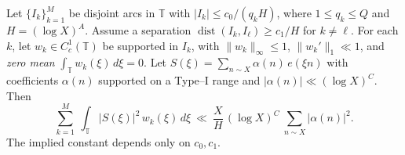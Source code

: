 \begin{lemma}\label{lem:LS-zero-mean}
Let $\{I_k\}_{k=1}^{M}$ be disjoint arcs in $\mathbb T$ with $|I_k|\le c_0/(q_k H)$, where $1\le q_k\le Q$ and $H=(\log X)^A$. 
Assume a separation $\operatorname{dist}(I_k,I_\ell)\ge c_1/H$ for $k\neq \ell$. 
For each $k$, let $w_k\in C_c^1(\mathbb T)$ be supported in $I_k$, with $\|w_k\|_\infty\le 1$, $\|w_k'\|_1\ll 1$, and \emph{zero mean} $\int_{\mathbb T} w_k(\xi)\,d\xi=0$.
Let $S(\xi)=\sum_{n\sim X}\alpha(n)\,e(\xi n)$ with coefficients $\alpha(n)$ supported on a Type--I range and $|\alpha(n)|\ll(\log X)^C$. Then
\begin{equation}\label{eq:LS-arc}
\sum_{k=1}^{M}\ \int_{\mathbb T}|S(\xi)|^2\,w_k(\xi)\,d\xi
\ \ll\ \frac{X}{H}\,(\log X)^C\ \sum_{n\sim X}|\alpha(n)|^2.
\end{equation}
The implied constant depends only on $c_0,c_1$.
\end{lemma}


